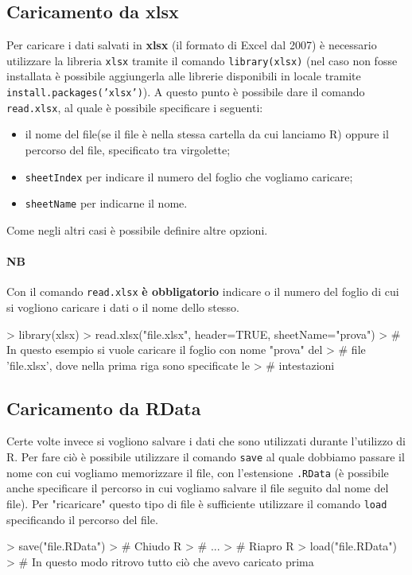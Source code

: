 \subsection{Caricamento da xlsx}
Per caricare i dati salvati in \textbf{xlsx} (il formato di Excel dal 2007) 
è necessario utilizzare la libreria \texttt{xlsx}
tramite il comando \texttt{library(xlsx)} (nel caso non fosse installata
è possibile aggiungerla alle librerie disponibili in locale tramite 
\texttt{install.packages('xlsx')}). A questo punto è possibile dare il 
comando \texttt{read.xlsx}, al quale è possibile specificare i seguenti:
\begin{itemize}
  \item il nome del file(se il file è nella stessa cartella da cui lanciamo R)
  oppure il percorso del file, specificato tra virgolette;
  \item \texttt{sheetIndex} per indicare il numero del foglio che vogliamo 
  caricare;
  \item \texttt{sheetName} per indicarne il nome.
\end{itemize}
Come negli altri casi è possibile definire altre opzioni.
\paragraph*{NB} Con il comando \texttt{read.xlsx} \textbf{è obbligatorio} 
indicare o il numero del foglio di cui si vogliono caricare i dati o
il nome dello stesso.

\begin{Schunk}
\begin{Sinput}
> library(xlsx)
> read.xlsx("file.xlsx", header=TRUE, sheetName="prova")
> # In questo esempio si vuole caricare il foglio con nome "prova" del 
> # file 'file.xlsx', dove nella prima riga sono specificate le 
> # intestazioni
\end{Sinput}
\end{Schunk}

\subsection{Caricamento da RData}
Certe volte invece si vogliono salvare i dati che sono utilizzati durante
l'utilizzo di R. Per fare ciò è possibile utilizzare il comando 
\texttt{save} al quale dobbiamo passare il nome con cui vogliamo memorizzare
il file, con l'estensione \texttt{.RData} (è possibile anche specificare il 
percorso in cui vogliamo salvare il file seguito dal nome del file). Per 
"ricaricare" questo tipo di file è sufficiente utilizzare il comando 
\texttt{load} specificando il percorso del file. 

\begin{Schunk}
\begin{Sinput}
> save("file.RData")
> # Chiudo R
> # ...
> # Riapro R
> load("file.RData")
> # In questo modo ritrovo tutto ciò che avevo caricato prima
\end{Sinput}
\end{Schunk}

